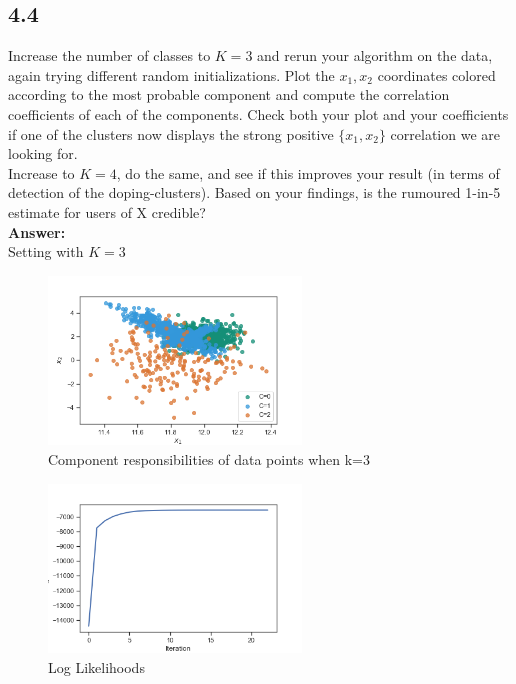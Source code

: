 \documentclass[a4paper]{article}
\begin{document}
\subsection*{4.4}

Increase the number of classes to $K = 3$ and rerun your algorithm on the data, again trying different random initializations. Plot the $x_1, x_2$ coordinates colored according to the most probable component and compute the correlation coefficients of each of the components. Check both your plot and your coefficients if one of the clusters now displays the strong positive $\{ x_1, x_2\}$ correlation we are looking for.\\
Increase to $K = 4$, do the same, and see if this improves your result (in terms of detection of the doping-clusters). Based on your findings, is the rumoured 1-in-5 estimate for users of X credible?\\


\textbf{Answer:}\\

Setting with $K = 3$\\

\begin{figure}[H]
\center
\includegraphics[width=0.6\textwidth]{Images/figure_4_4_a_resp.png}
\caption{Component responsibilities of data points when k=3}
\label{Fig:4_4_a_responsibilities}
\end{figure}

\begin{figure}[H]
\center
\includegraphics[width=0.6\textwidth]{Images/figure_4_4_a_log_likelihoods.png}
\caption{Log Likelihoods}
\label{Fig:4_4_a_log_likelihoods}
\end{figure}
\end{document}
